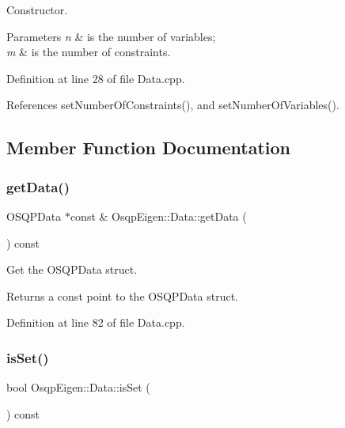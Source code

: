 Constructor. 


\begin{DoxyParams}{Parameters}
{\em n} & is the number of variables; \\
\hline
{\em m} & is the number of constraints. \\
\hline
\end{DoxyParams}


Definition at line 28 of file Data.\+cpp.



References set\+Number\+Of\+Constraints(), and set\+Number\+Of\+Variables().



\subsection{Member Function Documentation}
\mbox{\label{classOsqpEigen_1_1Data_a4d9b55f6a91c0f83a178cc6927c2599b}} 
\subsubsection{\texorpdfstring{get\+Data()}{getData()}}
{\footnotesize\ttfamily O\+S\+Q\+P\+Data $\ast$const  \& Osqp\+Eigen\+::\+Data\+::get\+Data (\begin{DoxyParamCaption}{ }\end{DoxyParamCaption}) const}



Get the O\+S\+Q\+P\+Data struct. 

\begin{DoxyReturn}{Returns}
a const point to the O\+S\+Q\+P\+Data struct. 
\end{DoxyReturn}


Definition at line 82 of file Data.\+cpp.

\mbox{\label{classOsqpEigen_1_1Data_aac543c780466b0db451ca60f0a5753eb}} 
\subsubsection{\texorpdfstring{is\+Set()}{isSet()}}
{\footnotesize\ttfamily bool Osqp\+Eigen\+::\+Data\+::is\+Set (\begin{DoxyParamCaption}{ }\end{DoxyParamCaption}) const}



